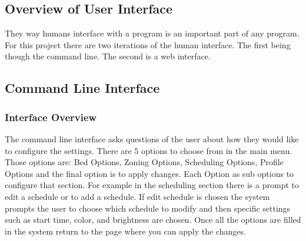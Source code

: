 			        \subsection{Overview of User Interface}
			        They way humans interface with a program is an important part of any program.
			        For this project there are two iterations of the human interface. The
			        first being though the command line. The second is a web interface.
			        \subsection{Command Line Interface}
			            \subsubsection{Interface Overview}
			            The command line interface asks questions of the user about how they
			            would like to configure the settings. There are 5 options to
			            choose from in the main menu. Those options are: Bed Options, Zoning Options,
			            Scheduling Options, Profile Options and the final option is to apply changes.
			            Each Option as sub options to configure that section. For example in the
			            scheduling section there is a prompt to edit a schedule or to add a schedule.
			            If edit schedule is chosen the system prompts the user to choose which
			            schedule to modify and then specific settings such as start time, color, and brightness are chosen.
			            Once all the options are filled in the system return to the page where you can apply the changes.
